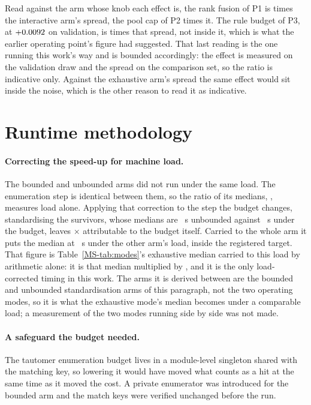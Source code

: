\documentclass[journal=jcisd8,manuscript=suppinfo,layout=onecolumn]{achemso}
\begin{document}
Read against the arm whose knob each effect is, the rank fusion of P1 is \numSpreadPOneInsd{}
times the interactive arm's spread, the pool cap of P2 \numSpreadPTwoInsd{} times it. The rule
budget of P3, at $+0.0092$ on validation, is \numSpreadPThreeInsd{} times that spread,
not inside it, which is what the earlier operating point's figure had suggested. That last reading
is the one running this work's way and is bounded accordingly: the effect is measured on the
validation draw and the spread on the comparison set, so the ratio is indicative only. Against the
exhaustive arm's spread the same effect would sit inside the noise, which is the other reason to
read it as indicative.

\section{Runtime methodology}
\label{sec:si-runtime}

\paragraph{Correcting the speed-up for machine load.} The bounded and unbounded arms did not run
under the same load. The enumeration step is identical between them, so the ratio of its medians,
\numHOneFiveLoad{}, measures load alone. Applying that correction to the step the budget changes,
standardising the survivors, whose medians are \numHOneFiveStdunbounded~s unbounded against
\numHOneFiveStdbounded~s under the budget, leaves \numHOneFiveAttributable$\times$ attributable
to the budget itself. Carried to the whole arm it puts the median at
\numHOneFiveMedianUnderload~s under the other arm's load, inside the registered target. That
figure is Table~\ref{MS-tab:modes}'s exhaustive median carried to this load by arithmetic alone:
it is that median multiplied by \numHOneFiveLoad{}, and it is the only load-corrected
timing in this work. The arms it is derived between are the bounded and unbounded standardisation
arms of this paragraph, not the two operating modes, so it is what the exhaustive mode's median
becomes under a comparable load; a measurement of the two modes running side by side was not made.

\paragraph{A safeguard the budget needed.} The tautomer enumeration budget lives in a
module-level singleton shared with the matching key, so lowering it would have moved what counts
as a hit at the same time as it moved the cost. A private enumerator was introduced for the
bounded arm and the match keys were verified unchanged before the run.
\end{document}

